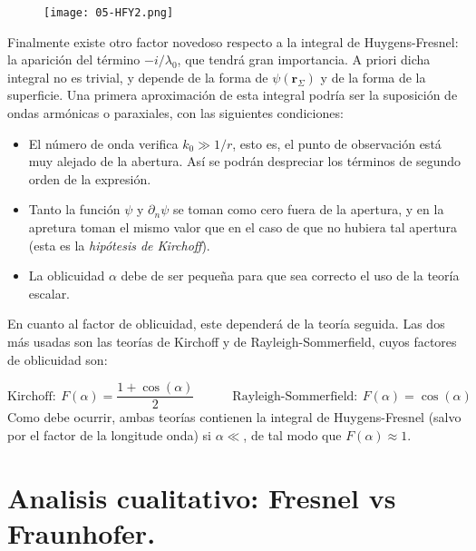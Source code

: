 \documentclass[12pt,a4paper]{book}
\numberwithin{equation}{section}
\numberwithin{figure}{section}
\newcommand{\tquad}{\quad \quad \quad}
\newcommand{\1}{_{(1)}}
\newcommand{\2}{_{(2)}}
\newcommand{\rn}{\mathbf{r}}
\theoremstyle{definition}
\begin{document}
\begin{figure}[h!]
    \centering
    \texttt{[image: 05-HFY2.png]}
    \caption{}
    \label{Fig:05.2-1}
\end{figure}

Finalmente existe otro factor novedoso respecto a la integral de Huygens-Fresnel: la aparición del término $-i/\lambda_0$, que tendrá gran importancia. A priori dicha integral no es trivial, y depende de la forma de $\psi(\rn_\Sigma)$ y de la forma de la superficie. Una primera aproximación de esta integral podría ser la suposición de ondas armónicas o paraxiales, con las siguientes condiciones: 

\begin{itemize}
    \item El número de onda verifica $k_0 \gg 1/r$, esto es, el punto de observación está muy alejado de la abertura. Así se podrán despreciar los términos de segundo orden de la expresión. 
    \item Tanto la función $\psi$ y $\partial_n \psi$ se toman como cero fuera de la apertura, y en la apretura toman el mismo valor que en el caso de que no hubiera tal apertura (esta es la \textit{hipótesis de Kirchoff}).
    \item La oblicuidad $\alpha$ debe de ser pequeña para que sea correcto el uso de la teoría escalar.  \\
\end{itemize}

En cuanto al factor de oblicuidad, este dependerá de la teoría seguida. Las dos más usadas son las teorías de Kirchoff y de Rayleigh-Sommerfield, cuyos factores de oblicuidad son:


\begin{equation}
    \text{Kirchoff}: \ F(\alpha) = \frac{1+\cos(\alpha)}{2} \tquad
    \text{Rayleigh-Sommerfield}: \ F(\alpha) = \cos (\alpha) 
\end{equation}
Como debe ocurrir, ambas teorías contienen la integral de Huygens-Fresnel (salvo por el factor de la longitude onda) si $\alpha\ll$, de tal modo que $F(\alpha) \approx 1$. 

\section{Analisis cualitativo: Fresnel vs Fraunhofer.}
\end{document}
